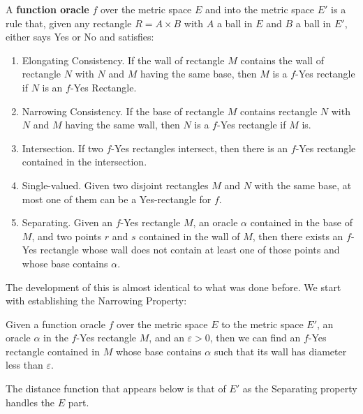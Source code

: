 \documentclass[12pt]{article}
\begin{document}
A \textbf{function oracle} $f$ over the metric space $E$ and into the metric space $E'$ is a rule that, given any rectangle $R= A \times B$ with $A$ a ball in $E$ and $B$ a ball in  $E'$, either says Yes or No and satisfies: 
\begin{enumerate}
    \item Elongating Consistency. If the wall of rectangle $M$ contains the wall of rectangle $N$ with $N$ and $M$ having the same base,  then $M$ is a $f$-Yes rectangle if $N$  is an $f$-Yes Rectangle. 
    \item Narrowing Consistency. If the base of rectangle $M$ contains rectangle $N$ with $N$ and $M$ having the same wall, then $N$ is a $f$-Yes rectangle if $M$ is. 
    \item Intersection. If two $f$-Yes rectangles intersect, then there is an $f$-Yes rectangle contained in the intersection. 
    \item Single-valued. Given two disjoint rectangles $M$ and $N$ with the same base, at most one of them can be a Yes-rectangle for $f$. 
    \item Separating. Given an $f$-Yes rectangle $M$, an oracle $\alpha$ contained in the base of $M$, and two points $r$ and $s$ contained in the wall of $M$, then there exists an $f$-Yes rectangle whose wall does not contain at least one of those points and whose base contains $\alpha$.
\end{enumerate} 

The development of this is almost identical to what was done before. We start with establishing the Narrowing Property: 

\begin{proposition}\label{pr:metricfshrink}
Given a function oracle $f$ over the metric space $E$ to the metric space $E'$, an oracle $\alpha$ in the $f$-Yes rectangle $M$, and an $\varepsilon > 0$, then we can find an $f$-Yes rectangle contained in $M$ whose base contains $\alpha$ such that its wall has diameter less than $\varepsilon$.
\end{proposition}

The distance function that appears below is that of $E'$ as the Separating property handles the $E$ part. 
\end{document}
